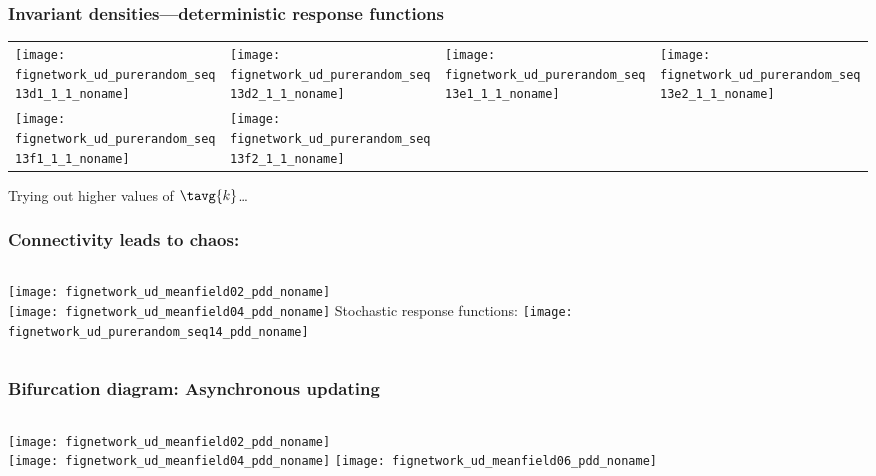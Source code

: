 \begin{frame}
  \frametitle{Invariant densities---deterministic response functions}
  \begin{tabular}{llll}
    \texttt{[image: fignetwork\_ud\_purerandom\_seq13d1\_1\_1\_noname]} &
      \texttt{[image: fignetwork\_ud\_purerandom\_seq13d2\_1\_1\_noname]} &
      \texttt{[image: fignetwork\_ud\_purerandom\_seq13e1\_1\_1\_noname]} &
      \texttt{[image: fignetwork\_ud\_purerandom\_seq13e2\_1\_1\_noname]} \\
      \texttt{[image: fignetwork\_ud\_purerandom\_seq13f1\_1\_1\_noname]} &
      \texttt{[image: fignetwork\_ud\_purerandom\_seq13f2\_1\_1\_noname]} &
      \\
  \end{tabular}
  Trying out higher values of $\tavg{k}$\ldots


\end{frame}


\begin{frame}
  \frametitle{Connectivity leads to chaos:}

  \begin{columns}
    \texttt{[image: fignetwork\_ud\_meanfield02\_pdd\_noname]}\\
    \texttt{[image: fignetwork\_ud\_meanfield04\_pdd\_noname]} 
    Stochastic response functions:
    \texttt{[image: fignetwork\_ud\_purerandom\_seq14\_pdd\_noname]}  
  \end{columns}
  
\end{frame}



  
\begin{frame}
  \frametitle{Bifurcation diagram: Asynchronous updating}

  \begin{columns}
    \texttt{[image: fignetwork\_ud\_meanfield02\_pdd\_noname]} \\
    \texttt{[image: fignetwork\_ud\_meanfield04\_pdd\_noname]} 
    \texttt{[image: fignetwork\_ud\_meanfield06\_pdd\_noname]}  
  \end{columns}
  
\end{frame}

